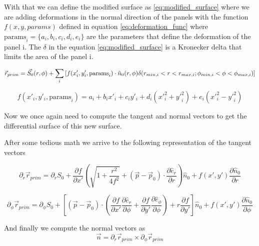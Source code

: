 With that we can define the modified surface as \ref{eq:modified_surface} where we are adding deformations in the normal direction of the panels with the function $f(x,y, params)$ defined in equation \ref{eq:deformation_func} where $\text{params}_i=\{a_i, b_i, c_i, d_i, e_i\}$ are the parameters that define the deformation of the panel i. The $\delta$ in the equation \ref{eq:modified_surface} is a Kronecker delta that limits the area of the panel i.


\begin{equation}
    \vec{r}_{prim} =\vec{S_{0}}(r,\phi)+\sum_i \left[ f(x'_i, y'_i,\text{params}_i )\cdot \hat{n}_0(r,\phi) \delta({\tiny r_{min,i}<r<r_{max,i}; \phi_{min,i}<\phi<\phi_{max,i}}) \right]
    \label{eq:modified_surface}
\end{equation}

\begin{equation}
    f(x'_i,y'_i, \text{params}_i) = a_i+b_ix'_i+c_iy'_i+d_i({x'}_{i}^2+{y'}_i^2)+e_i({x'}_i^2-{y'}_i^2)
    \label{eq:deformation_func}
\end{equation}


Now we once again need to compute the tangent and normal vectors to get the differential surface of this new surface. 


After some tedious math we arrive to the following representation of the tangent vectors

\begin{equation}
    \partial_r \vec{r}_{prim} =\partial_r S_0 +\frac{\partial f}{\partial x'}\left(\sqrt{1+\frac{r^2}{4f^2}}+(\vec{p}-\vec{p}_0)\cdot \frac{\partial \hat{e}_r}{\partial r} \right)\hat{n}_0+f(x',y')\frac{\partial \hat{n}_0}{\partial r}
\end{equation}

\begin{equation}
    \partial_{\phi}\vec{r}_{prim} = \partial_{\phi} S_0 + \left[ (\vec{p}-\vec{p}_0)\cdot \left( \frac{\partial f}{\partial x'}\frac{\partial \hat{e}_r}{\partial \phi} + \frac{\partial f}{\partial y'} \frac{\partial \hat{e}_\phi}{\partial \phi}\right) +r\frac{\partial f}{\partial y'}\right]\hat{n}_0 + f(x',y')\frac{\partial \hat{n}_0}{\partial \phi}
\end{equation}

And finally we compute the normal vectors as
\begin{equation}
    \vec{n} = \partial_r\vec{r}_{prim}  \times \partial_{\phi}\vec{r}_{prim}
\end{equation}

